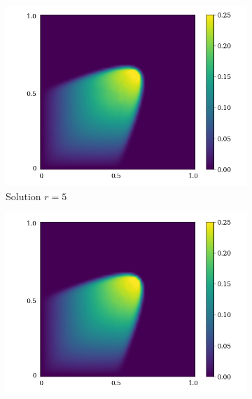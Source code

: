 \begin{figure}[!htb]
     \begin{center}
        \begin{subfigure}[b]{0.23\textwidth}
            \begin{center}
                \includegraphics[trim = {0, 0, 3cm, 0}, clip, width=\textwidth]{Pictures/X-rom-LE-SAE-5.png}
            \end{center}
            \caption{Solution $r = 5$}
        \end{subfigure}
   \begin{subfigure}[b]{0.23\textwidth}
        \begin{center}
            \includegraphics[trim = {0, 0, 3cm, 0}, clip, width=\textwidth]{Pictures/X-rom-LE-SAE-10.png}

\end{center}
\end{subfigure}
\end{center}
\end{figure}
